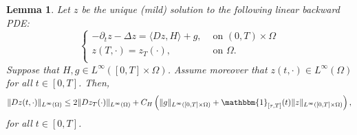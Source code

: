 \documentclass[10pt,a4paper,nouppercase,nowrite]{article}
\numberwithin{equation}{section}
\newcommand{\di}{{\rm d}}
\newtheorem{lem}[defn]{Lemma}
\theoremstyle{definition}
\begin{document}
	\begin{lem} \label{app2}
		Let $z$ be the unique (mild) solution to the following linear backward PDE:
		\begin{equation}
			\begin{cases}
				-\partial_t z - \Delta z = \langle Dz,H \rangle + g, & \text{ on } (0,T) \times \Omega \\
				z(T,\cdot)=z_T(\cdot),& \text{ on } \Omega. \\
			\end{cases}
			\label{app2pde}
		\end{equation}
		Suppose that $H,g \in L^{\infty}([0,T] \times \Omega)$. Assume moreover that $z(t,\cdot) \in L^{\infty}(\Omega)$ for all $t \in [0,T]$. Then,
		\begin{equation}
			\| Dz(t,\cdot) \|_{L^{\infty}(\Omega)} \le 2 \| Dz_T(\cdot) \|_{L^{\infty}(\Omega)} + C_H \left( \| g \|_{L^{\infty}([0,T] \times \Omega)} + \mathbbm{1}_{[\tau,T]}(t) \| z \|_{L^{\infty}([0,T] \times \Omega)} \right),
			\label{estlemDz}
		\end{equation}
		for all $t \in [0,T]$.
	\end{lem}
\end{document}

